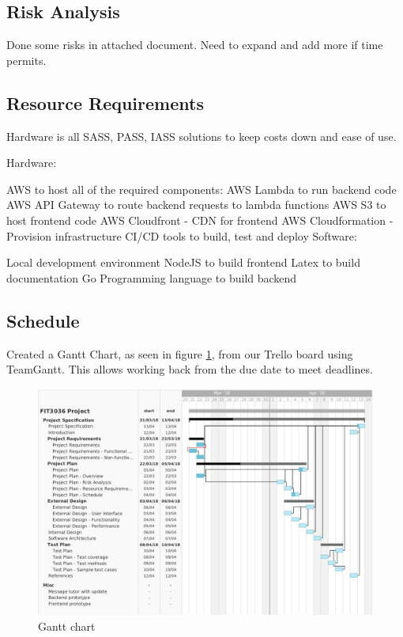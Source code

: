 \documentclass[a4paper,11pt]{article}
\begin{document}
\subsection{Risk Analysis}


Done some risks in attached document. Need to expand and add more if time permits.

\subsection{Resource Requirements}


Hardware is all SASS, PASS, IASS solutions to keep costs down and ease of use.

Hardware:

AWS to host all of the required components:
AWS Lambda to run backend code
AWS API Gateway to route backend requests to lambda functions
AWS S3 to host frontend code
AWS Cloudfront - CDN for frontend
AWS Cloudformation - Provision infrastructure
CI/CD tools to build, test and deploy
Software:

Local development environment
NodeJS to build frontend
Latex to build documentation
Go Programming language to build backend

\subsection{Schedule}


Created a Gantt Chart, as seen in figure \ref{fig:gantt}, from our Trello board using TeamGantt. This allows working back from the due date to meet deadlines.

\begin{figure}[H]
\includegraphics[width=\textwidth]{gantt-chart}
\caption{Gantt chart}
    \label{fig:gantt}
\end{figure}
\end{document}
